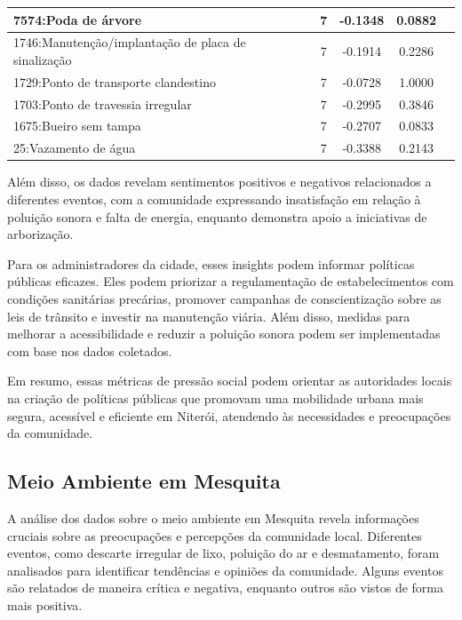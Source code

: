 \begin{table}[htbp]
\begin{tabular}{|l|c|c|c|c|}
		\hline
		7574:Poda de árvore                                 & 7                & -0.1348        & 0.0882           \\
		\hline
		1746:Manutenção/implantação de placa de sinalização & 7                & -0.1914        & 0.2286           \\
		\hline
		1729:Ponto de transporte clandestino                & 7                & -0.0728        & 1.0000           \\
		\hline
		1703:Ponto de travessia irregular                   & 7                & -0.2995        & 0.3846           \\
		\hline
		1675:Bueiro sem tampa                               & 7                & -0.2707        & 0.0833           \\
		\hline
		25:Vazamento de água                                & 7                & -0.3388        & 0.2143           \\
		\hline
	\end{tabular}
\end{table}

Além disso, os dados revelam sentimentos positivos e negativos relacionados a diferentes eventos, com a comunidade expressando insatisfação em relação à poluição sonora e falta de energia, enquanto demonstra apoio a iniciativas de arborização.

Para os administradores da cidade, esses insights podem informar políticas públicas eficazes. Eles podem priorizar a regulamentação de estabelecimentos com condições sanitárias precárias, promover campanhas de conscientização sobre as leis de trânsito e investir na manutenção viária. Além disso, medidas para melhorar a acessibilidade e reduzir a poluição sonora podem ser implementadas com base nos dados coletados.

Em resumo, essas métricas de pressão social podem orientar as autoridades locais na criação de políticas públicas que promovam uma mobilidade urbana mais segura, acessível e eficiente em Niterói, atendendo às necessidades e preocupações da comunidade.

\subsection{Meio Ambiente em Mesquita}
A análise dos dados sobre o meio ambiente em Mesquita revela informações cruciais sobre as preocupações e percepções da comunidade local. Diferentes eventos, como descarte irregular de lixo, poluição do ar e desmatamento, foram analisados para identificar tendências e opiniões da comunidade. Alguns eventos são relatados de maneira crítica e negativa, enquanto outros são vistos de forma mais positiva.

